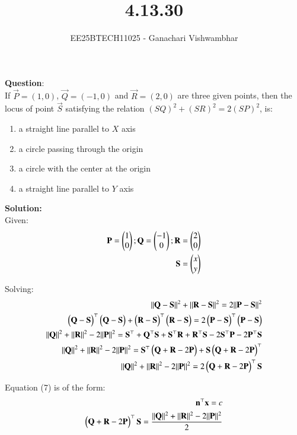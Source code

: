 \documentclass[journal]{IEEEtran}
\begin{document}
\title{4.13.30}
\author{EE25BTECH11025 - Ganachari Vishwambhar}
\maketitle

\textbf{Question}:\\
If $\vec{P}=(1,0)$, $\vec{Q} = (-1,0)$  and $\vec{R}=(2,0)$ are three given points, then the locus of point $\vec{S}$ satisfying the relation $(SQ)^2+(SR)^2=2(SP)^2$, is:\\
\begin{enumerate}
    \item a straight line parallel to $X$ axis
    \item a circle passing through the origin
    \item a circle with the center at the origin
    \item a straight line parallel to $Y$ axis
\end{enumerate}
\textbf{Solution: }\\
Given:
\begin{align}
    \mathbf{P}=\begin{pmatrix}1\\0\end{pmatrix}; \mathbf{Q}=\begin{pmatrix}-1\\0\end{pmatrix}; \mathbf{R}=\begin{pmatrix}2\\0\end{pmatrix}\\
    \mathbf{S}=\begin{pmatrix}x\\y\end{pmatrix}
\end{align}

Solving:
\begin{align}
    ||\mathbf{Q}-\mathbf{S}||^2+||\mathbf{R}-\mathbf{S}||^2=2||\mathbf{P}-\mathbf{S}||^2\\
    \begin{pmatrix}\mathbf{Q}-\mathbf{S}\end{pmatrix}^\top\begin{pmatrix}\mathbf{Q}-\mathbf{S}\end{pmatrix}+\begin{pmatrix}\mathbf{R}-\mathbf{S}\end{pmatrix}^\top\begin{pmatrix}\mathbf{R}-\mathbf{S}\end{pmatrix}=2\begin{pmatrix}\mathbf{P}-\mathbf{S}\end{pmatrix}^\top\begin{pmatrix}\mathbf{P}-\mathbf{S}\end{pmatrix}\\
    ||\mathbf{Q}||^2+||\mathbf{R}||^2-2||\mathbf{P}||^2=\mathbf{S}^\top+\mathbf{Q}^\top\mathbf{S}+\mathbf{S}^\top\mathbf{R}+\mathbf{R}^\top\mathbf{S}-2\mathbf{S}^\top\mathbf{P}-2\mathbf{P}^\top\mathbf{S}\\
    ||\mathbf{Q}||^2+||\mathbf{R}||^2-2||\mathbf{P}||^2=\mathbf{S}^\top\begin{pmatrix}\mathbf{Q}+\mathbf{R}-2\mathbf{P}\end{pmatrix}+\mathbf{S}\begin{pmatrix}\mathbf{Q}+\mathbf{R}-2\mathbf{P}\end{pmatrix}^\top\\
    ||\mathbf{Q}||^2+||\mathbf{R}||^2-2||\mathbf{P}||^2=2\begin{pmatrix}\mathbf{Q}+\mathbf{R}-2\mathbf{P}\end{pmatrix}^\top\mathbf{S}
\end{align}

Equation (7) is of the form:
\begin{align}
    \mathbf{n}^\top\mathbf{x}=c\\
    \begin{pmatrix}\mathbf{Q}+\mathbf{R}-2\mathbf{P}\end{pmatrix}^\top\mathbf{S}=\frac{||\mathbf{Q}||^2+||\mathbf{R}||^2-2||\mathbf{P}||^2}{2}
\end{align}
\end{document}
